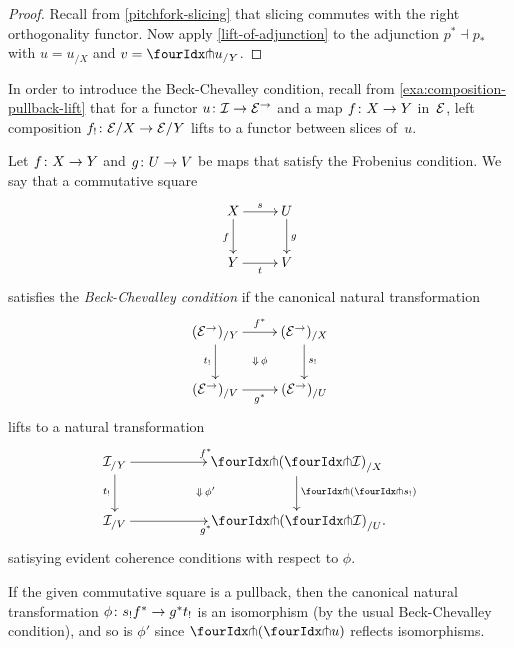 \documentclass[reqno,10pt,a4paper,oneside,draft]{amsart}
\begin{document}
\begin{proof}
Recall from \cref{pitchfork-slicing} that slicing commutes with the right orthogonality functor.
Now apply \cref{lift-of-adjunction} to the adjunction $p^* \dashv p_*$ with $u = u_{/X}$ and $v = \liftr{u}_{/Y}$.
\end{proof}

In order to introduce the Beck-Chevalley condition, recall from \cref{exa:composition-pullback-lift} that for a functor
$u \colon \mathcal{I} \to \mathcal{E}^\to$ and a map $f \colon X \to Y$ in~$\mathcal{E}$, left composition $f_! \colon \mathcal{E}/X \to \mathcal{E}/Y$ lifts to a functor between slices of~$u$.



\begin{definition} \label{def:beck-chevalley}
Let $f \colon X \to Y$ and $g \colon U \to V$ be maps that satisfy the Frobenius condition.
We say that a commutative square
\[
\xymatrix{
  X
  \ar[d]_{f}
  \ar[r]^{s}
&
  U
  \ar[d]^{g}
\\
  Y
  \ar[r]_{t}
&
  V
}
\]
satisfies the \emph{Beck-Chevalley condition} if the canonical natural transformation
\[
\xymatrix{
  (\cal{E}^\to)_{/Y}
   \ar[d]_{t_!}
  \ar[r]^{f^*} \ar@{}[dr]|{\Downarrow \, \phi}
&
  (\cal{E}^\to)_{/X}
  \ar[d]^{s_!}
\\
  (\cal{E}^\to)_{/V}
  \ar[r]_{g^*}
&
  (\cal{E}^\to)_{/U}
}
\]
lifts to a natural transformation
\[
\xymatrix@C+3em{
   \cal{I}_{/Y}
    \ar[r]^{f^*}
     \ar[d]_{t_!}
    \ar@{}[dr]|{\Downarrow \, \phi'}
   &
  \liftl{(\liftr{\cal{I}})}_{/X}
  \ar[d]^{\liftl{(\liftr{s_!})}} \\
  \cal{I}_{/V}
   \ar[r]_{g^*}
 &
   \liftl{(\liftr{\cal{I}})}_{/U} \rlap{.}
}
\]
satisying evident coherence conditions with respect to $\phi$.
\end{definition}

\begin{remark}
If the given commutative square is a pullback, then the canonical natural transformation $\phi \colon s_! f^* \to g^* t_!$ is an isomorphism (by the usual Beck-Chevalley condition), and so is $\phi'$ since $\liftl{(\liftr{u})}$ reflects isomorphisms.
\end{remark}
\end{document}
